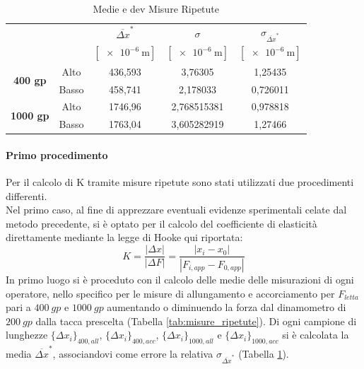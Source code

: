 \documentclass[a4paper,11pt,oneside]{article}
\begin{document}
\begin{table}[h!]
    \centering
    \begin{tabular}{|c|c|c|c|c|}
        \hline
          \multicolumn{2}{|c|}{\multirow{2}{*}{}} & ${\overline{\Delta x}}^\ast$& $\sigma$ & $\sigma_{{\overline{\Delta x}}^\ast}$\\
          \multicolumn{2}{|c|}{} & $[\SI{e-6}{\meter}]$ & $[\SI{e-6}{\meter}]$ & $[\SI{e-6}{\meter}]$\\ 
          \hline
          \multirow{2}{*}{\textbf{400 gp}}& {\cellcolor[rgb]{0.85,0.85,0.85}}Alto & {\cellcolor[rgb]{0.85,0.85,0.85}}436,593&	{\cellcolor[rgb]{0.85,0.85,0.85}}3,76305&	{\cellcolor[rgb]{0.85,0.85,0.85}}1,25435\\ \cline{2-5}
          &Basso&   458,741&	2,178033&	0,726011\\
          \hline
          \multirow{2}{*}{\textbf{1000 gp}}& {\cellcolor[rgb]{0.85,0.85,0.85}}Alto & {\cellcolor[rgb]{0.85,0.85,0.85}}1746,96&	{\cellcolor[rgb]{0.85,0.85,0.85}}2,768515381&	{\cellcolor[rgb]{0.85,0.85,0.85}}0,978818\\ \cline{2-5}
          &Basso&   1763,04&	3,605282919&	1,27466\\
         \hline
    \end{tabular}
    \caption{Medie e dev Misure Ripetute}
    \label{tab:medie_misure_ripetute}
\end{table}{}
\paragraph{Primo procedimento}
Per il calcolo di K tramite misure ripetute sono stati utilizzati due procedimenti differenti.\\
Nel primo caso, al fine di apprezzare eventuali evidenze sperimentali celate dal metodo precedente, si è optato per il calcolo del coefficiente di elasticità direttamente mediante la legge di Hooke qui riportata:\\%
\begin{equation*}
    K=\frac{\left | \Delta x \right |}{\left | \Delta F \right |}=\frac{\left | x_{i}-x_{0} \right |}{\left | F_{i, app}- F_{0, app} \right |}
\end{equation*}
In primo luogo si è proceduto con il calcolo delle medie delle misurazioni di ogni operatore, nello specifico per le misure di allungamento e accorciamento per $F_{letta}$ pari a $\SI{400}{gp}$ e $\SI{1000}{gp}$ aumentando o diminuendo la forza dal dinamometro di $\SI{200}{gp}$ dalla tacca prescelta (Tabella \ref{tab:misure_ripetute}). Di ogni campione di lunghezze $\{ {\Delta x}_i \}_{400, all}$, $\{ {\Delta x}_i \}_{400, acc}$, $\{ {\Delta x}_i \}_{1000, all}$ e $\{ {\Delta x}_i \}_{1000, acc}$ si è calcolata la media ${\overline{\Delta x}}^\ast$, associandovi come errore la relativa $\sigma_{\overline{\Delta x}^\ast}$ (Tabella \ref{tab:medie_misure_ripetute}).\\
\end{document}

